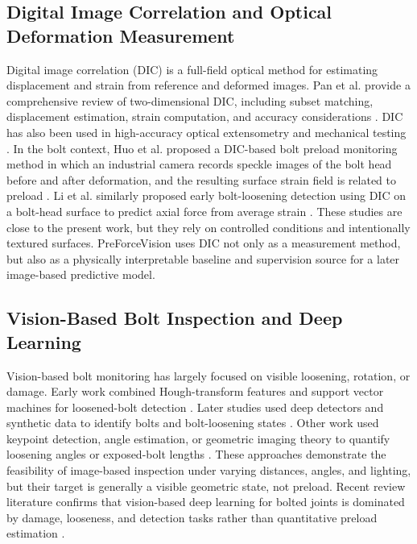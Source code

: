\subsection{Digital Image Correlation and Optical Deformation Measurement}

Digital image correlation (DIC) is a full-field optical method for estimating displacement and strain from reference and deformed images. Pan et al. provide a comprehensive review of two-dimensional DIC, including subset matching, displacement estimation, strain computation, and accuracy considerations \cite{pan2009dic}. DIC has also been used in high-accuracy optical extensometry and mechanical testing \cite{zhu2017extensometer}. In the bolt context, Huo et al. proposed a DIC-based bolt preload monitoring method in which an industrial camera records speckle images of the bolt head before and after deformation, and the resulting surface strain field is related to preload \cite{huo2026dic}. Li et al. similarly proposed early bolt-loosening detection using DIC on a bolt-head surface to predict axial force from average strain \cite{li2024dic}. These studies are close to the present work, but they rely on controlled conditions and intentionally textured surfaces. PreForceVision uses DIC not only as a measurement method, but also as a physically interpretable baseline and supervision source for a later image-based predictive model.

\subsection{Vision-Based Bolt Inspection and Deep Learning}

Vision-based bolt monitoring has largely focused on visible loosening, rotation, or damage. Early work combined Hough-transform features and support vector machines for loosened-bolt detection \cite{cha2016vision}. Later studies used deep detectors and synthetic data to identify bolts and bolt-loosening states \cite{pham2020bolt,ta2020monitoring,ta2022corroded,sun2022yolo, afifi2026gaussian}. Other work used keypoint detection, angle estimation, or geometric imaging theory to quantify loosening angles or exposed-bolt lengths \cite{gong2022quantitative,qian2024loosening}. These approaches demonstrate the feasibility of image-based inspection under varying distances, angles, and lighting, but their target is generally a visible geometric state, not preload. Recent review literature confirms that vision-based deep learning for bolted joints is dominated by damage, looseness, and detection tasks rather than quantitative preload estimation \cite{malik2024review}.

